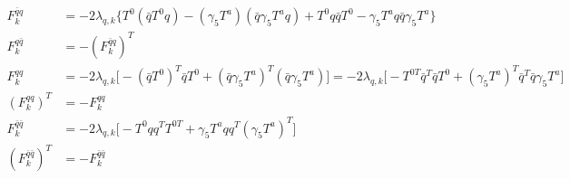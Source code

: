 \documentclass[UTF8]{article}
\begin{document}
\begin{equation}
\begin{split}
F^{\bar{q}q}_k&=-2\lambda_{q,k}\bigg\{ T^0(\bar{q}T^0q)-(\gamma_5T^a)(\bar{q}\gamma_5T^aq)+T^0q\bar{q}T^0-\gamma_5T^aq\bar{q}\gamma_5T^a \bigg\}\\
F^{q\bar{q}}_k&=-(F^{\bar{q}q}_k)^T\\
F^{qq}_k&=-2\lambda_{q,k}\bigg[ -(\bar{q}T^0)^T\bar{q}T^0+(\bar{q}\gamma_5T^a)^T(\bar{q}\gamma_5T^a) \bigg]=-2\lambda_{q,k}\bigg[ -T^{0T}\bar{q}^T\bar{q}T^0+(\gamma_5T^a)^T\bar{q}^T\bar{q}\gamma_5T^a\bigg]\\
(F^{qq}_k)^T&=-F^{qq}_k\\
F^{\bar{q}\bar{q}}_k&=-2\lambda_{q,k}\bigg[ -T^0qq^TT^{0T}+\gamma_5T^aqq^T(\gamma_5T^a)^T \bigg]\\
(F^{\bar{q}\bar{q}}_k)^T&=-F^{\bar{q}\bar{q}}_k
\end{split}
\end{equation}
\end{document}
